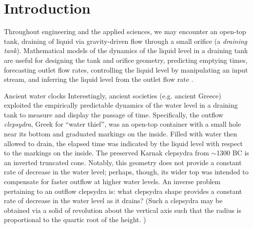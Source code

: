 \documentclass[openacc]{rsproca_new}%
\begin{document}
\rsbreak


\section{Introduction}
Throughout engineering and the applied sciences, we may encounter an open-top tank, draining of liquid via gravity-driven flow through a small orifice (a \emph{draining tank}).
Mathematical models of the dynamics of the liquid level in a draining tank are useful for designing the tank and orifice geometry, predicting emptying times, forecasting outlet flow rates, controlling the liquid level by manipulating an input stream, and inferring the liquid level from the outlet flow rate \cite{d2021torricelli,seborg2016process,groetsch1993inverse_tl,groetsch1999inverse}.

\begin{mytcbox}[label=box:waterclocks, breakable]{Ancient water clocks}
Interestingly, ancient societies (e.g. ancient Greece) exploited the empirically predictable dynamics of the water level in a draining tank to measure and display the passage of time.
Specifically, the outflow \emph{clepsydra}, Greek for ``water thief'', was an open-top container with a small hole near its bottom and graduated markings on the inside. 
Filled with water then allowed to drain, the elapsed time was indicated by the liquid level with respect to the markings on the inside. \cite{bedini1962compartmented,hwang2021historical,ritner2016oriental,hejun1987research,schomberg2018karnak,mills1982newton}
The preserved Karnak clepsydra from $\sim$1300 BC \cite{schomberg2018karnak} is an inverted truncated cone. Notably, this geometry does not provide a constant rate of decrease in the water level; perhaps, though, its wider top was intended to compensate for faster outflow at higher water levels. An inverse problem pertaining to an outflow clepsydra is: what clepsydra shape provides a constant rate of decrease in the water level as it drains?
(Such a clepsydra may be obtained via a solid of revolution about the vertical axis such that the radius is proportional to the quartic root of the height. \cite{mills1982newton,d2021torricelli})
\end{mytcbox}
\end{document}
